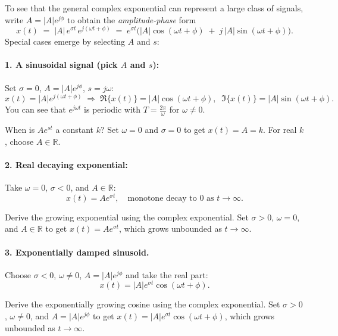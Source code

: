 \documentclass{ee102_notes}
\begin{document}
To see that the general complex exponential can represent a large class of signals, write $A = |A|e^{j\phi}$ to obtain the \emph{amplitude-phase} form
\[
x(t) \;=\; |A|\,e^{\sigma t}\,e^{j(\omega t + \phi)}
\;=\; e^{\sigma t}\Big(|A|\cos(\omega t+\phi) \;+\; j\,|A|\sin(\omega t+\phi)\Big).
\]
Special cases emerge by selecting $A$ and $s$:

\paragraph{1. A sinusoidal signal (pick $A$ and $s$):}
Set $\sigma=0$, $A=|A|e^{j\phi}$, $s=j\omega$:
\[
x(t) = |A|e^{j(\omega t+\phi)} \;\Rightarrow\;
\Re\{x(t)\} = |A|\cos(\omega t+\phi),\;\; \Im\{x(t)\}=|A|\sin(\omega t+\phi).
\]
You can see that $e^{j\omega t}$ is periodic with $T=\tfrac{2\pi}{\omega}$ for $\omega\neq 0$.

\begin{popquiz} When is $A e^{s t}$ a constant $k$?
    \popqsplit 
    Set $\omega=0$ and $\sigma=0$ to get $x(t)=A=k$. For real $k$, choose $A\in\mathbb{R}$.
\end{popquiz}
\paragraph{2. Real decaying exponential:}
Take $\omega=0$, $\sigma<0$, and $A\in\mathbb{R}$:
\[
x(t)=A e^{\sigma t},\quad \text{monotone decay to $0$ as $t\to\infty$.}
\]
\begin{popquiz} Derive the growing exponential using the complex exponential.
    \popqsplit 
    Set $\sigma>0$, $\omega=0$, and $A\in\mathbb{R}$ to get $x(t)=A e^{\sigma t}$, which grows unbounded as $t\to\infty$.
\end{popquiz}

\paragraph{3. Exponentially damped sinusoid.}
Choose $\sigma<0$, $\omega\neq 0$, $A=|A|e^{j\phi}$ and take the real part:
\[
x(t)=|A|e^{\sigma t}\cos(\omega t+\phi).
\]
\begin{popquiz} Derive the exponentially growing cosine using the complex exponential.
\popqsplit 
    Set $\sigma>0$, $\omega\neq 0$, and $A=|A|e^{j\phi}$ to get $x(t)=|A|e^{\sigma t}\cos(\omega t+\phi)$, which grows unbounded as $t\to\infty$.
\end{popquiz}
\end{document}
